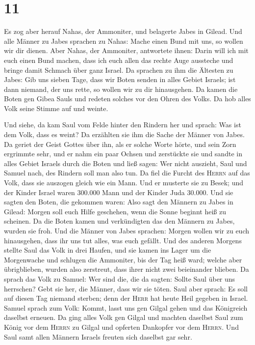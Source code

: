 \hypertarget{section-10}{%
\section{11}\label{section-10}}

 Es zog aber herauf Nahas, der Ammoniter, und belagerte
Jabes in Gilead. Und alle Männer zu Jabes sprachen zu Nahas: Mache einen
Bund mit uns, so wollen wir dir dienen.  Aber Nahas, der
Ammoniter, antwortete ihnen: Darin will ich mit euch einen Bund machen,
dass ich euch allen das rechte Auge aussteche und bringe damit Schmach
über ganz Israel.  Da sprachen zu ihm die Ältesten zu
Jabes: Gib uns sieben Tage, dass wir Boten senden in alles Gebiet
Israels; ist dann niemand, der uns rette, so wollen wir zu dir
hinausgehen.  Da kamen die Boten gen Gibea Sauls und
redeten solches vor den Ohren des Volks. Da hob alles Volk seine Stimme
auf und weinte.

 Und siehe, da kam Saul vom Felde hinter den Rindern her
und sprach: Was ist dem Volk, dass es weint? Da erzählten sie ihm die
Sache der Männer von Jabes.  Da geriet der Geist Gottes
über ihn, als er solche Worte hörte, und sein Zorn ergrimmte sehr,
 und er nahm ein paar Ochsen und zerstückte sie und sandte
in alles Gebiet Israels durch die Boten und ließ sagen: Wer nicht
auszieht, Saul und Samuel nach, des Rindern soll man also tun. Da fiel
die Furcht des \textsc{Herrn} auf das Volk, dass sie auszogen gleich wie
ein Mann.  Und er musterte sie zu Besek; und der Kinder
Israel waren 300.000 Mann und der Kinder Juda 30.000.  Und
sie sagten den Boten, die gekommen waren: Also sagt den Männern zu Jabes
in Gilead: Morgen soll euch Hilfe geschehen, wenn die Sonne beginnt heiß
zu scheinen. Da die Boten kamen und verkündigten das den Männern zu
Jabes, wurden sie froh.  Und die Männer von Jabes
sprachen: Morgen wollen wir zu euch hinausgehen, dass ihr uns tut alles,
was euch gefällt.  Und des anderen Morgens stellte Saul
das Volk in drei Haufen, und sie kamen ins Lager um die Morgenwache und
schlugen die Ammoniter, bis der Tag heiß ward; welche aber übrigblieben,
wurden also zerstreut, dass ihrer nicht zwei beieinander blieben.
 Da sprach das Volk zu Samuel: Wer sind die, die da
sagten: Sollte Saul über uns herrschen? Gebt sie her, die Männer, dass
wir sie töten.  Saul aber sprach: Es soll auf diesen Tag
niemand sterben; denn der \textsc{Herr} hat heute Heil gegeben in
Israel.  Samuel sprach zum Volk: Kommt, lasst uns gen
Gilgal gehen und das Königreich daselbst erneuen.  Da
ging alles Volk gen Gilgal und machten daselbst Saul zum König vor dem
\textsc{Herrn} zu Gilgal und opferten Dankopfer vor dem \textsc{Herrn}.
Und Saul samt allen Männern Israels freuten sich daselbst gar sehr.

